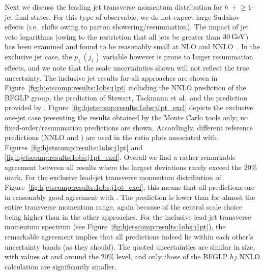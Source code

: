 Next we discuss the leading jet transverse momentum distribution for
$h\,+\!\ge\!1$-jet final states. For this type of observable, we do
not expect large Sudakov effects (i.e.~shifts owing to parton
showering/resummation). The impact of jet veto logarithms (owing to
the restriction that all jets be greater than $30\text{\:GeV}$) has been
examined and found to be reasonably small at NLO and
NNLO~\cite{Banfi:2012jm,Banfi:2015pju}.
In the exclusive jet case, the $p_\perp(j_1)$ variable however is
prone to larger resummation effects, and we note that the scale
uncertainties shown will not reflect the true uncertainty. The
inclusive jet results for all approaches are shown in
Figure~\ref{fig:hjetscomp:results:1obs:j1pt} including the NNLO
prediction of the BFGLP group, the prediction of Stewart, Tackmann
et al.~and the prediction provided by \Resbos.
Figure~\ref{fig:hjetscomp:results:1obs:j1pt_excl} depicts the
exclusive one-jet case presenting the results obtained by the Monte
Carlo tools only; no fixed-order/resummation predictions are shown.
Accordingly, different reference predictions (NNLO and \Powheg) are
used in the ratio plots associated with
Figures~\ref{fig:hjetscomp:results:1obs:j1pt} and
\ref{fig:hjetscomp:results:1obs:j1pt_excl}. 
Overall we find a rather remarkable agreement
between all results where the largest deviations rarely exceed the
20\% mark. For the exclusive lead-jet transverse momentum distribution
of Figure~\ref{fig:hjetscomp:results:1obs:j1pt_excl}, this means that
all predictions are in reasonably good agreement with \Powheg. The
\MGaMC prediction is lower than \Powheg for almost the entire
transverse momentum range, again because of the central scale choice
being higher than in the other approaches. For the inclusive lead-jet
transverse momentum spectrum (see
Figure~\ref{fig:hjetscomp:results:1obs:j1pt}), the remarkable
agreement implies that all predictions indeed lie within each other's
uncertainty bands (as they should). The quoted uncertainties are similar in size, with
values at and around the 20\% level, and only those of the BFGLP $hj$
NNLO calculation are significantly smaller. 

